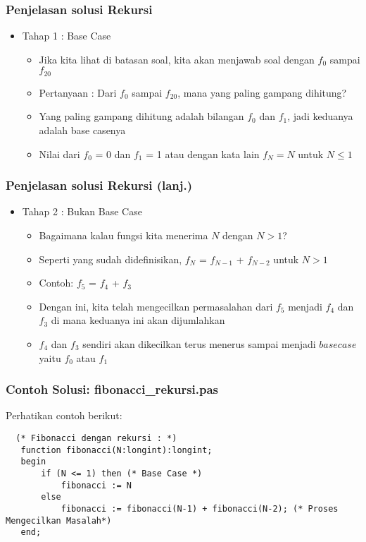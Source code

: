 \documentclass{beamer}
\begin{document}
\begin{frame}
\frametitle{Penjelasan solusi Rekursi}
\begin{itemize}
    \item Tahap 1 : Base Case
    \begin {itemize}
        \item Jika kita lihat di batasan soal, kita akan menjawab soal dengan $f_0$ sampai $f_{20}$
        \item Pertanyaan : Dari $f_0$ sampai $f_{20}$, mana yang paling gampang dihitung?
        \item Yang paling gampang dihitung adalah bilangan $f_0$ dan $f_1$, jadi keduanya adalah base casenya
        \item Nilai dari $f_0$ = 0 dan $f_1$ = 1 atau dengan kata lain $f_N = N$ untuk $N \le 1$
    \end {itemize}
\end{itemize}
\end{frame}

\begin{frame}
\frametitle{Penjelasan solusi Rekursi (lanj.) }
\begin{itemize}
    \item Tahap 2 : Bukan Base Case
    \begin {itemize}
        \item Bagaimana kalau fungsi kita menerima $N$ dengan $N > 1$?
        \item Seperti yang sudah didefinisikan, $f_N$ = $f_{N-1}$ + $f_{N-2}$ untuk $N > 1$
        \item Contoh: $f_5$ = $f_4$ + $f_3$
        \item Dengan ini, kita telah mengecilkan permasalahan dari $f_5$ menjadi $f_4$ dan $f_3$ di mana keduanya ini akan dijumlahkan
        \item $f_4$ dan $f_3$ sendiri akan dikecilkan terus menerus sampai menjadi $base case$ yaitu $f_0$ atau $f_1$
    \end {itemize}
\end{itemize}
\end{frame}

\begin{frame}[fragile]
\frametitle{Contoh Solusi: fibonacci\_rekursi.pas}
Perhatikan contoh berikut:
\begin{lstlisting}
  (* Fibonacci dengan rekursi : *)
   function fibonacci(N:longint):longint;
   begin
       if (N <= 1) then (* Base Case *)
           fibonacci := N
       else
           fibonacci := fibonacci(N-1) + fibonacci(N-2); (* Proses Mengecilkan Masalah*)
   end;
\end{lstlisting}
\end{frame}
\end{document}
